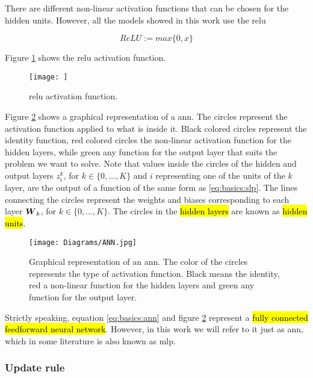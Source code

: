 There are different non-linear activation functions that can be chosen for the hidden units. However, all the models showed in this work use the \gls{relu}

\begin{equation}
  ReLU := max\{0, x\}
\end{equation}

Figure \ref{fig:basics:ann:relu} shows the \gls{relu} activation function.

\begin{figure}[!ht]
  \centering
  \texttt{[image: ]}
  \caption{\gls{relu} activation function.}
  \label{fig:basics:ann:relu}
\end{figure}

Figure \ref{fig:basics:ann:ann} shows a graphical representation of a \gls{ann}. The circles represent the activation function applied to what is inside it. Black colored circles represent the identity function, red colored circles the non-linear activation function for the hidden layers, while green any function for the output layer that suits the problem we want to solve. Note that values inside the circles of the hidden and output layers $z^k_i$, for $k\in\{0, \dots, K\}$ and $i$ representing one of the units of the $k$ layer, are the output of a function of the same form as \ref{eq:basics:slp}. The lines connecting the circles represent the weights and biases corresponding to each layer $\boldsymbol{W}_k$, for $k\in\{0, \dots, K\}$. The circles in the \hl{hidden layers} are known as \hl{hidden units}.

\begin{figure}[!ht]
  \centering
  \texttt{[image: Diagrams/ANN.jpg]}
  \caption{Graphical representation of an \gls{ann}. The color of the circles represents the type of activation function. Black means the identity, red a non-linear function for the hidden layers and green any function for the output layer.}
  \label{fig:basics:ann:ann}
\end{figure}

Strictly speaking, equation \ref{eq:basics:ann} and figure \ref{fig:basics:ann:ann} represent a \hl{fully connected feedforward neural network}. However, in this work we will refer to it just as \gls{ann}, which in some literature is also known as \gls{mlp}.

\subsubsection{Update rule}

